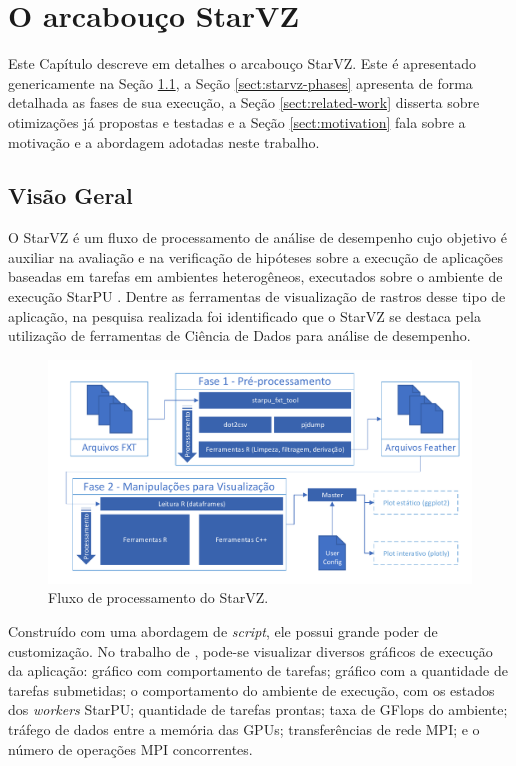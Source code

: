 \chapter{O arcabouço StarVZ} \label{ch:starvz}

Este Capítulo descreve em detalhes o arcabouço StarVZ. Este é 
apresentado genericamente na Seção \ref{sect:starvz-overview}, a Seção 
\ref{sect:starvz-phases} apresenta de forma detalhada as fases de sua 
execução, a Seção \ref{sect:related-work} disserta sobre otimizações já 
propostas e testadas e a Seção \ref{sect:motivation} fala sobre a motivação e a 
abordagem adotadas neste trabalho.

\section{Visão Geral}\label{sect:starvz-overview}

O StarVZ \cite{ref:starvz} é um fluxo de processamento de análise de desempenho 
cujo objetivo é auxiliar na avaliação e na verificação de hipóteses sobre a 
execução de aplicações baseadas em tarefas em ambientes heterogêneos, executados 
sobre o ambiente de execução StarPU \cite{ref:starpu}. Dentre as ferramentas de 
visualização de rastros desse tipo de aplicação, na pesquisa realizada foi 
identificado que o StarVZ se destaca pela utilização de ferramentas de 
Ciência de Dados para análise de desempenho.

\begin{figure}[H]
 \centerline{\includegraphics[width=1\textwidth]{./img/all-proc.pdf}}
 \caption{Fluxo de processamento do StarVZ.}
 \label{fig:starvz-workflow-general}
\end{figure}

Construído com uma abordagem de \textit{script}, ele possui grande poder de 
customização. No trabalho de \citet{ref:starvz}, pode-se visualizar diversos 
gráficos de execução da aplicação: gráfico com comportamento de tarefas; 
gráfico com a quantidade de tarefas submetidas; o comportamento do ambiente de 
execução, com os estados dos \emph{workers} StarPU; quantidade de tarefas 
prontas; taxa de GFlops do ambiente; tráfego de dados entre a memória das GPUs; 
transferências de rede MPI; e o número de operações MPI concorrentes.

